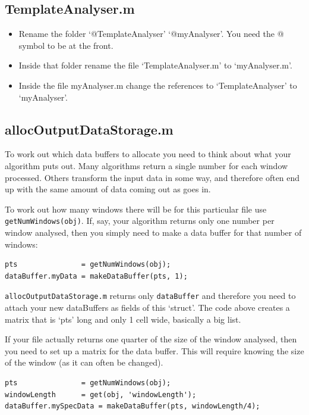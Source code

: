 \documentclass{article}
\begin{document}
\subsection{TemplateAnalyser.m}

\begin{itemize}
	\item Rename the folder `@TemplateAnalyser' `@myAnalyser'. You need the @ symbol to be at the front.  
	\item Inside that folder rename the file `TemplateAnalyser.m' to `myAnalyser.m'. 
	\item Inside the file myAnalyser.m change the references to `TemplateAnalyser' to `myAnalyser'.
\end{itemize}

\subsection{allocOutputDataStorage.m}

To work out which data buffers to allocate you need to think about what your algorithm puts out. Many algorithms return a single number for each window  processed. Others transform the input data in some way, and therefore often end up with the same amount of data coming out as goes in. 

To work out how many windows there will be for this particular file use \texttt{getNumWindows(obj)}. If, say, your algorithm returns only one number per window analysed, then you simply need to make a data buffer for that number of windows:

\begin{verbatim}
pts               = getNumWindows(obj); 
dataBuffer.myData = makeDataBuffer(pts, 1);
\end{verbatim}

\texttt{allocOutputDataStorage.m} returns only \texttt{dataBuffer} and therefore you need to attach your new dataBuffers as fields of this `struct'. The code above creates a matrix that is `pts' long and only 1 cell wide, basically a big list.

If your file actually returns one quarter of the size of the window analysed, then you need to set up a matrix for the data buffer. This will require knowing the size of the window (as it can often be changed). 

\begin{verbatim}
pts               = getNumWindows(obj);
windowLength      = get(obj, 'windowLength'); 
dataBuffer.mySpecData = makeDataBuffer(pts, windowLength/4);
\end{verbatim}
\end{document}
